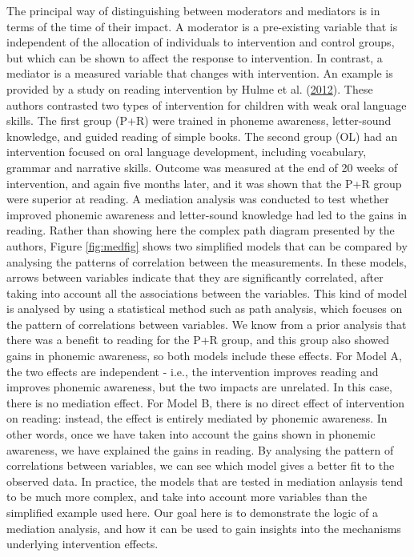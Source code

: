 \documentclass{krantz}
\begin{document}
The principal way of distinguishing between moderators and mediators is in terms of the time of their impact. A moderator is a pre-existing variable that is independent of the allocation of individuals to intervention and control groups, but which can be shown to affect the response to intervention. In contrast, a mediator is a measured variable that changes with intervention. An example is provided by a study on reading intervention by Hulme et al. (\protect\hyperlink{ref-hulme2012}{2012}). These authors contrasted two types of intervention for children with weak oral language skills. The first group (P+R) were trained in phoneme awareness, letter-sound knowledge, and guided reading of simple books. The second group (OL) had an intervention focused on oral language development, including vocabulary, grammar and narrative skills. Outcome was measured at the end of 20 weeks of intervention, and again five months later, and it was shown that the P+R group were superior at reading. A mediation analysis  was conducted to test whether improved phonemic awareness and letter-sound knowledge had led to the gains in reading. Rather than showing here the complex path diagram presented by the authors, Figure \ref{fig:medfig} shows two simplified models that can be compared by analysing the patterns of correlation between the measurements. In these models, arrows between variables indicate that they are significantly correlated, after taking into account all the associations between the variables. This kind of model is analysed by using a statistical method such as path analysis, which focuses on the pattern of correlations between variables. We know from a prior analysis that there was a benefit to reading for the P+R group, and this group also showed gains in phonemic awareness, so both models include these effects. For Model A, the two effects are independent - i.e., the intervention improves reading and improves phonemic awareness, but the two impacts are unrelated. In this case, there is no mediation effect. For Model B, there is no direct effect of intervention on reading: instead, the effect is entirely mediated by phonemic awareness. In other words, once we have taken into account the gains shown in phonemic awareness, we have explained the gains in reading. By analysing the pattern of correlations between variables, we can see which model gives a better fit to the observed data. In practice, the models that are tested in mediation anlaysis tend to be much more complex, and take into account more variables than the simplified example used here. Our goal here is to demonstrate the logic of a mediation analysis, and how it can be used to gain insights into the mechanisms underlying intervention effects.
\end{document}
